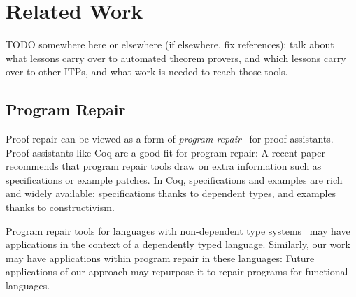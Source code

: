 \chapter{Related Work}
\label{sec:related}


\iffalse

TODO somewhere here or elsewhere (if elsewhere, fix references): talk about what lessons carry over to automated theorem provers,
and which lessons carry over to other ITPs, and what work is needed to reach those tools.

\section{Program Repair}


Proof repair can be viewed as a form of \textit{program repair}~\cite{Monperrus:2018:ASR:3177787.3105906, Gazzola:2018:ASR:3180155.3182526}
for proof assistants.
Proof assistants like Coq are a good fit for program repair: A recent paper~\cite{Qi:2015:APP:2771783.2771791} 
recommends that program repair tools draw on extra information
such as specifications or example patches. In Coq, specifications and examples 
are rich and widely available: specifications thanks to dependent types,
and examples thanks to constructivism.


Program repair tools for 
languages with non-dependent type 
systems~\cite{Pei:2014:APR:2731750.2731779, Long:2016:APG:2837614.2837617, Le:2017:SSS:3106237.3106309, Mechtaev:2016:ASM:2884781.2884807, Monperrus2015} 
may have applications in the context of a dependently typed language.
Similarly, our work may have applications within program repair in these languages:
Future applications of our approach may repurpose it to repair programs for functional languages.


